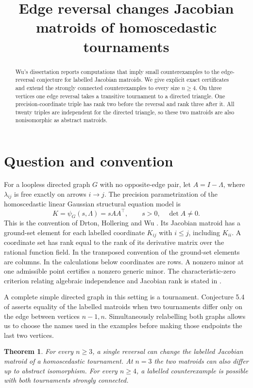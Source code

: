 \documentclass[11pt,a4paper]{amsart}
\title{Edge reversal changes Jacobian matroids of homoscedastic tournaments}
\date{}
\newtheorem{theorem}{Theorem}
\begin{document}
\begin{abstract}
Wu's dissertation reports computations that imply small counterexamples to
the edge-reversal conjecture for labelled Jacobian matroids. We give explicit
exact certificates and extend the strongly connected counterexamples to
every size \(n\ge4\). On three vertices one edge reversal takes a transitive
tournament to a directed triangle. One precision-coordinate triple has rank
two before the reversal and rank three after it. All twenty triples are
independent for the directed triangle, so these two matroids are also
nonisomorphic as abstract matroids.
\end{abstract}
\maketitle

\section{Question and convention}

For a loopless directed graph \(G\) with no opposite-edge pair, let \(A=I-\Lambda\),
where \(\lambda_{ij}\) is free exactly on arrows \(i\to j\). The precision
parametrization of the homoscedastic linear Gaussian structural equation
model is
\[
 K=\psi_G(s,\Lambda)=sAA^{\top},\qquad s>0,\quad \det A\ne0 .
\]
This is the convention of Drton, Hollering and Wu \cite{dhw}. Its Jacobian
matroid has a ground-set element for each labelled coordinate \(K_{ij}\)
with \(i\le j\), including \(K_{ii}\). A coordinate set has rank equal to
the rank of its derivative matrix over the rational function field.
In the transposed convention of \cite{dhw} the ground-set elements are
columns. In the calculations below coordinates are rows. A nonzero
minor at one admissible point certifies a nonzero generic minor.
The characteristic-zero criterion relating algebraic independence and
Jacobian rank is stated in \cite{dhw}.

A complete simple directed graph in this setting is a tournament.
Conjecture 5.4 of \cite{dhw} asserts equality of the labelled matroids
when two tournaments differ only on the edge between vertices \(n-1,n\).
Simultaneously relabelling both graphs allows us to choose the names
used in the examples before making those endpoints the last two vertices.

\begin{theorem}
For every \(n\ge3\), a single reversal can change the labelled Jacobian
matroid of a homoscedastic tournament. At \(n=3\) the two matroids can also
differ up to abstract isomorphism. For every \(n\ge4\), a labelled
counterexample is possible with both tournaments strongly connected.
\end{theorem}
\end{document}
